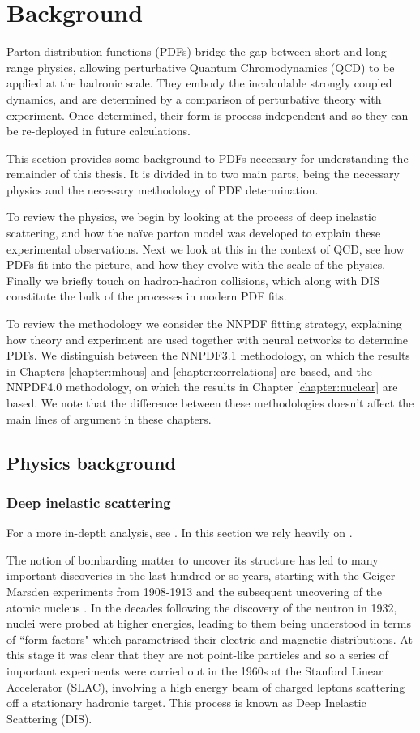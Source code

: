 \chapter{Background}
\label{chapter:background}
Parton distribution functions (PDFs) bridge the gap between short and long range physics, allowing perturbative Quantum Chromodynamics (QCD) to be applied at the hadronic scale. They embody the incalculable strongly coupled dynamics, and are determined by a comparison of perturbative theory with experiment. Once determined, their form is process-independent and so they can be re-deployed in future calculations. 

This section provides some background to PDFs neccesary for understanding the remainder of this thesis. It is divided in to two main parts, being the necessary physics and the necessary methodology of PDF determination.

To review the physics, we begin by looking at the process of deep inelastic scattering, and how the na\"ive parton model was developed to explain these experimental observations. Next we look at this in the context of QCD, see how PDFs fit into the picture, and how they evolve with the scale of the physics. Finally we briefly touch on hadron-hadron collisions, which along with DIS constitute the bulk of the processes in modern PDF fits.

To review the methodology we consider the NNPDF fitting strategy, explaining how theory and experiment are used together with neural networks to determine PDFs. We distinguish between the NNPDF3.1 methodology, on which the results in Chapters \ref{chapter:mhous} and \ref{chapter:correlations} are based, and the NNPDF4.0 methodology, on which the results in Chapter \ref{chapter:nuclear} are based. We note that the difference between these methodologies doesn't affect the main lines of argument in these chapters.

\section{Physics background}
\subsection{Deep inelastic scattering}
For a more in-depth analysis, see \cite{pinkbook, hm}. In this section we rely heavily on \cite{nikhefnotes, Hartland:2014nha}.

The notion of bombarding matter to uncover its structure has led to many important discoveries in the last hundred or so years, starting with the Geiger-Marsden experiments from 1908-1913 and the subsequent uncovering of the atomic nucleus \cite{nucleus}. In the decades following the discovery of the neutron in 1932, nuclei were probed at higher energies, leading to them being understood in terms of ``form factors" which parametrised their electric and magnetic distributions. At this stage it was clear that they are not point-like particles and so a series of important experiments were carried out in the 1960s at the Stanford Linear Accelerator (SLAC), involving a high energy beam of charged leptons scattering off a stationary hadronic target. This process is known as Deep Inelastic Scattering (DIS). 

